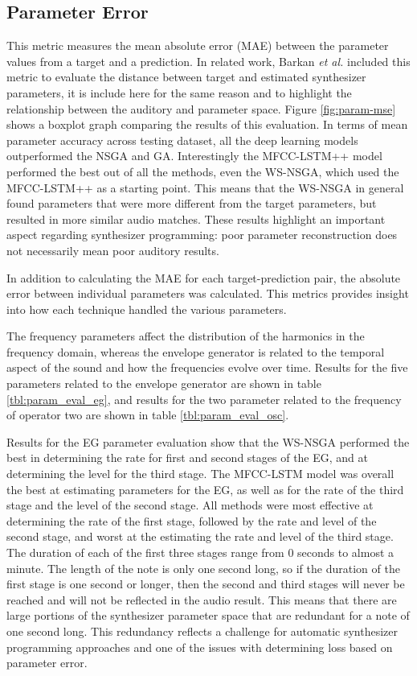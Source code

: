 \subsection{Parameter Error}
This metric measures the mean absolute error (MAE) between the parameter values from a target and a prediction. In related work, Barkan \textit{et al.} included this metric to evaluate the distance between target and estimated synthesizer parameters, it is include here for the same reason and to highlight the relationship between the auditory and parameter space. Figure \ref{fig:param-mse} shows a boxplot graph comparing the results of this evaluation. In terms of mean parameter accuracy across testing dataset, all the deep learning models outperformed the NSGA and GA. Interestingly the MFCC-LSTM++ model performed the best out of all the methods, even the WS-NSGA, which used the MFCC-LSTM++ as a starting point. This means that the WS-NSGA in general found parameters that were more different from the target parameters, but resulted in more similar audio matches. These results highlight an important aspect regarding synthesizer programming: poor parameter reconstruction does not necessarily mean poor auditory results.

In addition to calculating the MAE for each target-prediction pair, the absolute error between individual parameters was calculated. This metrics provides insight into how each technique handled the various parameters.

The frequency parameters affect the distribution of the harmonics in the frequency domain, whereas the envelope generator is related to the temporal aspect of the sound and how the frequencies evolve over time. Results for the five parameters related to the envelope generator are shown in table \ref{tbl:param_eval_eg}, and results for the two parameter related to the frequency of operator two are shown in table \ref{tbl:param_eval_osc}.

Results for the EG parameter evaluation show that the WS-NSGA performed the best in determining the rate for first and second stages of the EG, and at determining the level for the third stage. The MFCC-LSTM model was overall the best at estimating parameters for the EG, as well as for the rate of the third stage and the level of the second stage. All methods were most effective at determining the rate of the first stage, followed by the rate and level of the second stage, and worst at the estimating the rate and level of the third stage. The duration of each of the first three stages range from 0 seconds to almost a minute. The length of the note is only one second long, so if the duration of the first stage is one second or longer, then the second and third stages will never be reached and will not be reflected in the audio result. This  means that there are large portions of the synthesizer parameter space that are redundant for a note of one second long.  This redundancy reflects a challenge for automatic synthesizer programming approaches and one of the issues with determining loss based on parameter error.

